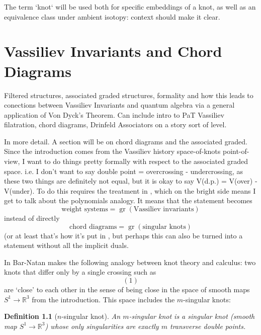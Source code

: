\documentclass[12pt]{report}
\newcommand{\R}{\mathbb{R}}
\theoremstyle{regular}
\numberwithin{clause}{chapter}
\newtheorem{definition}[clause]{Definition}
\newcommand{\scaffold}[1]{
\begin{mdframed}[style=scaffold]
        {\color{teal}#1}
\end{mdframed}
}
\begin{document}
        The term `knot` will be used both for specific embeddings of a knot, as well as an equivalence class under ambient isotopy: context should make it clear.

        \chapter{Vassiliev Invariants and Chord Diagrams}
        \label{ch:formality-and-chord-diagrams}

        \scaffold{Filtered structures, associated graded structures, formality and how this leads to conections between Vassiliev Invariants and quantum algebra via a general application of Von Dyck's Theorem. Can include intro to PaT Vassiliev filatration, chord diagrams, Drinfeld Associators on a story sort of level.}


        \scaffold{In more detail. A section will be on chord diagrams and the associated graded. Since the introduction comes from the Vassiliev history space-of-knots point-of-view, I want to do things pretty formally with respect to the associated graded space. i.e. I don't want to say double point = overcrossing - undercrossing, as these two things are definitely not equal, but it is okay to say V(d.p.) = V(over) - V(under). To do this requires the treatment in \cite{the-fundamental-theorem-of-vassiliev-invariants}, which on the bright side means I get to talk about the polynomials analogy. It means that the statement becomes \[\text{weight systems} = \operatorname{gr}(\text{Vassiliev invariants})\] instead of directly \[\text{chord diagrams} = \operatorname{gr}(\text{singular knots})\] (or at least that's how it's put in \cite{the-fundamental-theorem-of-vassiliev-invariants}, but perhaps this can also be turned into a statement without all the implicit duals.}

        In \cite{on-the-vassiliev-knot-invariants} Bar-Natan makes the following analogy between knot theory and calculus: two knots that differ only by a single crossing such as
        \[(1)\]
        are `close' to each other in the sense of being close in the space of smooth maps \(S^{1} \to \R^{3}\) from the introduction. This space includes the \(m\)-singular knots:
        \begin{definition}[\(n\)-singular knot]
                An \(m\)-singular knot is a singular knot (smooth map \(S^{1} \to \R^{3}\)) whose only singularities are exactly \(m\) transverse double points.
        \end{definition}
\end{document}
